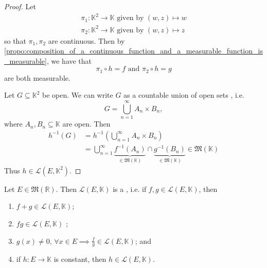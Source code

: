 \documentclass[notoc,notitlepage]{tufte-book}
\begin{document}
\begin{proof}
    Let
  \begin{gather*}
    \pi_1 : \mathbb{K}^2 \to \mathbb{K} \text{ given by } (w, z) \mapsto w \\
    \pi_2 : \mathbb{K}^2 \to \mathbb{K} \text{ given by } (w, z) \mapsto z
  \end{gather*}
  so that $\pi_1, \pi_2$ are continuous. Then by
  \cref{propo:composition_of_a_continuous_function_and_a_measurable_function_is_measurable},
  we have that
  \begin{equation*}
    \pi_1 \circ h = f \text{ and } \pi_2 \circ h = g
  \end{equation*}
  are both measurable.

  \noindent
   Let $G \subseteq \mathbb{K}^2$ be open. We can
  write $G$ as a countable union of open sets , i.e.
  \begin{equation*}
    G = \bigcup_{n=1}^{\infty} A_n \times B_n,
  \end{equation*}
  where $A_n, B_n \subseteq \mathbb{K}$ are open. Then
  \begin{align*}
    h^{-1}(G) &= h^{-1} \left( \bigcup_{n=1}^{\infty} A_n \times B_n \right) \\
              &= \bigcup_{n=1}^{\infty} \underbrace{f^{-1}(A_n)}_{\in
                \mathfrak{M}(\mathbb{K})} \cap \underbrace{g^{-1}(B_n)}_{\in
                \mathfrak{M}(\mathbb{K})} \in \mathfrak{M}(\mathbb{K})
  \end{align*}
  Thus $h \in \mathcal{L}(E, \mathbb{K}^2)$.
\end{proof}

\begin{propo}\label{propo:_l_e_k_is_a_unital_algebra}
  Let $E \in \mathfrak{M}(\mathbb{R})$. Then $\mathcal{L}(E, \mathbb{K})$ is a
  , i.e. if $f, g \in \mathcal{L}(E, \mathbb{K})$, then
  \begin{enumerate}
    \item $f + g \in \mathcal{L}(E, \mathbb{K})$;
    \item $fg \in \mathcal{L}(E, \mathbb{K})$ ;
    \item $g(x) \neq 0,\, \forall x \in E \implies \frac{f}{g} \in
      \mathcal{L}(E, \mathbb{K})$; and
    \item if $h : E \to \mathbb{K}$ is constant, then $h \in \mathcal{L}(E,
      \mathbb{K})$.
  \end{enumerate}
\end{propo}
\end{document}
